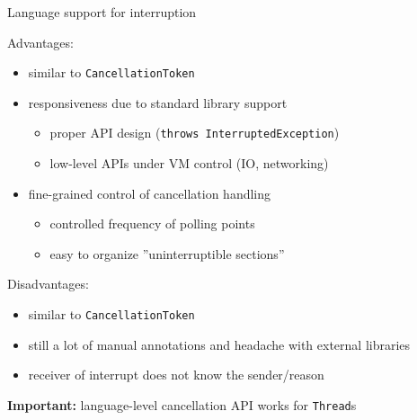 \begin{frame}[fragile]{Language support for interruption}

Advantages:
\begin{itemize}
    \item similar to \texttt{CancellationToken}
    \item responsiveness due to standard library support 
    \begin{itemize}
        \item proper API design (\texttt{throws InterruptedException})
        \item low-level APIs under VM control (IO, networking)
    \end{itemize}
    \item fine-grained control of cancellation handling 
    \begin{itemize}
        \item controlled frequency of polling points
        \item easy to organize ''uninterruptible sections''
    \end{itemize}
\end{itemize}

Disadvantages:
\begin{itemize}
    \item similar to \texttt{CancellationToken}
    \item still a lot of manual annotations and headache with external libraries
    \item receiver of interrupt does not know the sender/reason
\end{itemize}

\textbf{Important:} language-level cancellation API works for \texttt{Thread}s

\end{frame}



% 
% 
% 
% 
% 
% 

